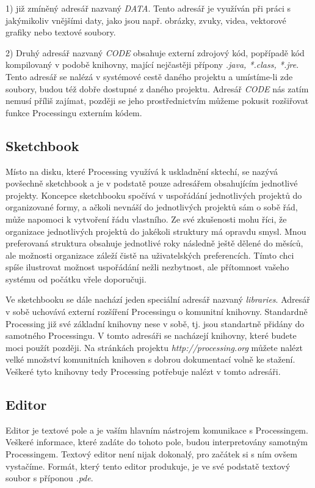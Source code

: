 \documentclass[10pt]{book}
\newcommand{\pododdil}[1]{\subsection{#1}\index{#1}\label{#1}}
\begin{document}
1) již zmíněný adresář nazvaný {\em DATA}. Tento adresář je využíván při práci s jakýmikoliv vnějšími daty, jako jsou např. obrázky, zvuky, videa, vektorové grafiky nebo textové soubory.

2) Druhý adresář nazvaný {\em CODE} obsahuje externí zdrojový kód, popřípadě kód kompilovaný v podobě knihovny, mající nejčastěji přípony {\em *.java, *.class, *.jre}. Tento adresář se nalézá v systémové cestě daného projektu a umístíme-li zde soubory, budou též dobře dostupné z daného projektu. Adresář {\em CODE} nás zatím nemusí příliš zajímat, později se jeho prostřednictvím můžeme pokusit rozšiřovat funkce Processingu externím kódem.


\pododdil{Sketchbook}

Místo na disku, které Processing využívá k uskladnění sktechí, se nazývá povšechně sketchbook a je v podstatě pouze adresářem obsahujícím jednotlivé projekty. Koncepce sketchbooku spočívá v uspořádání jednotlivých projektů do organizované formy, a ačkoli nevnáší do jednotlivých projektů sám o sobě řád, může napomoci k vytvoření řádu vlastního. Ze své zkušenosti mohu říci, že organizace jednotlivých projektů do jakékoli struktury má opravdu smysl. Mnou preferovaná struktura obsahuje jednotlivé roky následně ještě dělené do měsíců, ale možnosti organizace záleží čistě na uživatelských preferencích. Tímto chci spíše ilustrovat možnost uspořádání nežli nezbytnost, ale přítomnost vašeho systému od počátku vřele doporučuji.

Ve sketchbooku se dále nachází jeden speciální adresář nazvaný {\em libraries}. Adresář v sobě uchovává externí rozšíření Processingu o komunitní knihovny. Standardně Processing již své základní knihovny nese v sobě, tj. jsou standartně přidány do samotného Processingu. V tomto adresáři se nacházejí knihovny, které budete moci použít později. Na stránkách projektu {\em http://processing.org} můžete nalézt velké množství komunitních knihoven s dobrou dokumentací volně ke stažení. Veškeré tyto knihovny tedy Processing potřebuje nalézt v tomto adresáři.






\pododdil{Editor}

Editor je textové pole a je vaším hlavním nástrojem komunikace s Processingem. Veškeré informace, které zadáte do tohoto pole, budou interpretovány samotným Processingem. Textový editor není nijak dokonalý, pro začátek si s ním ovšem vystačíme. Formát, který tento editor produkuje, je ve své podstatě textový soubor s příponou {\em *.pde}.
\end{document}
